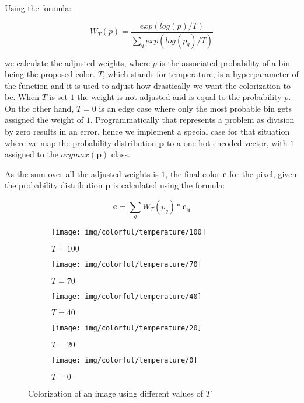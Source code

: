 Using the formula:

\begin{equation}
    W_T(p) = \frac{exp(log(p)/T)}{\sum_{q}{exp(log(p_q)/T)}}\label{eq:annealed_mean}
\end{equation}

we calculate the adjusted weights, where $p$ is the associated 
probability of a bin being the proposed color. $T$, which stands 
for temperature, is a hyperparameter of the function and it is used to 
adjust how drastically we want the colorization to be. When $T$ is set $1$
the weight is not adjusted and is equal to the probability $p$. On
the other hand, $T=0$ is an edge case where only the most probable bin 
gets assigned the weight of $1$. Programmatically that represents a problem 
as division  by zero results in an error, hence we implement a special case
for that situation where we map the probability distribution $\mathbf{p}$
to a one-hot encoded vector, with $1$ assigned to the $argmax(\mathbf{p})$
class.

As the sum over all the adjusted weights is $1$, the final color $\mathbf{c}$ 
for the pixel, given the probability distribution $\mathbf{p}$ is calculated 
using the formula:

\begin{equation}
    \mathbf{c} = \sum_{q}W_T(p_q) * \mathbf{c_q}\label{eq:weighed sum}
\end{equation}

\begin{figure}[!h]
	\centering
	\begin{subfigure}{.19\textwidth}
		\centering
		\texttt{[image: img/colorful/temperature/100]}
		\caption{$T=100$}
	\end{subfigure}
	\begin{subfigure}{.19\textwidth}
		\centering
		\texttt{[image: img/colorful/temperature/70]}
		\caption{$T=70$}
	\end{subfigure}
	\begin{subfigure}{.19\textwidth}
		\centering
		\texttt{[image: img/colorful/temperature/40]}
		\caption{$T=40$}
	\end{subfigure}
	\begin{subfigure}{.19\textwidth}
		\centering
		\texttt{[image: img/colorful/temperature/20]}
		\caption{$T=20$}
	\end{subfigure}
	\begin{subfigure}{.19\textwidth}
		\centering
		\texttt{[image: img/colorful/temperature/0]}
		\caption{$T=0$}
	\end{subfigure}
	\caption{Colorization of an image using different values of $T$}
	\label{fig:temperature}
\end{figure}

